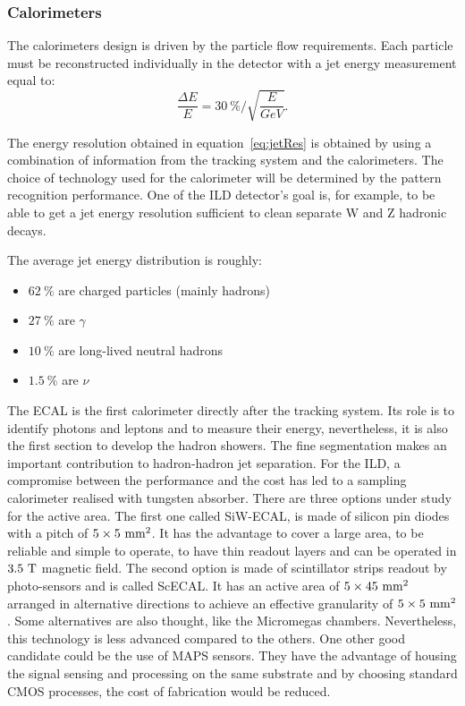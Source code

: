       \subsubsection{Calorimeters}

      The calorimeters design is driven by the particle flow requirements.
      Each particle must be reconstructed individually in the detector with a jet energy measurement equal to:
      \begin{equation}
        \frac{\Delta E}{E} = 30~\% / \sqrt{\frac{E}{GeV}}.
        \label{eq:jetRes}
      \end{equation}

      The energy resolution obtained in equation~\ref{eq:jetRes} is obtained by using a combination of information from the tracking system and the calorimeters. 
      The choice of technology used for the calorimeter will be determined by the pattern recognition performance. 
      One of the \gls{ILD} detector's goal is, for example, to be able to get a jet energy resolution sufficient to clean separate W and Z hadronic decays.
      
      The average jet energy distribution is roughly: 
      \begin{itemize}
        \item $62~\%$ are charged particles (mainly hadrons)
        \item $27~\%$ are $\gamma$
        \item $10~\%$ are long-lived neutral hadrons
        \item $1.5~\%$ are $\nu$
      \end{itemize}

      The \gls{ECAL} is the first calorimeter directly after the tracking system.
      Its role is to identify photons and leptons and to measure their energy, nevertheless, it is also the first section to develop the hadron showers.
      The fine segmentation makes an important contribution to hadron-hadron jet separation.
      For the \gls{ILD}, a compromise between the performance and the cost has led to a sampling calorimeter realised with tungsten absorber.
      There are three options under study for the active area.
      The first one called SiW-ECAL, is made of silicon pin diodes with a pitch of $5 \times 5~\rm{mm}^2$. 
      It has the advantage to cover a large area, to be reliable and simple to operate, to have thin readout layers and can be operated in $3.5~\rm{T}$ magnetic field.
      The second option is made of scintillator strips readout by photo-sensors and is called ScECAL.
      It has an active area of $5 \times 45~\rm{mm}^2$ arranged in alternative directions to achieve an effective granularity of $5 \times 5~\rm{mm}^2$. 
      Some alternatives are also thought, like the Micromegas chambers. Nevertheless, this technology is less advanced compared to the others.
      One other good candidate could be the use of \gls{MAPS} sensors.
      They have the advantage of housing the signal sensing and processing on the same  substrate and by choosing standard CMOS processes, the cost of fabrication would be reduced.


